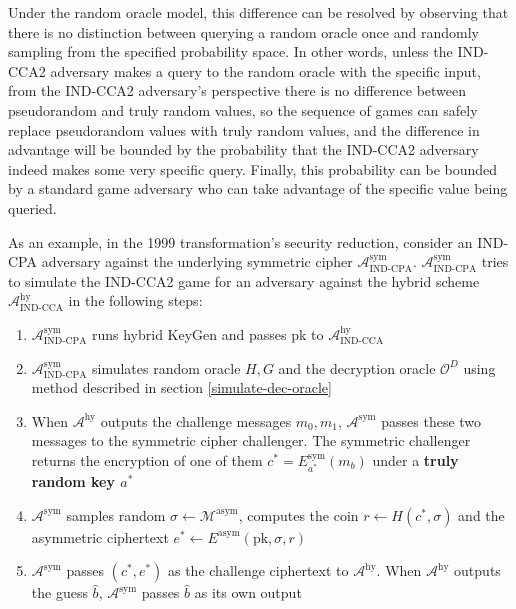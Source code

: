 \documentclass{article}
\begin{document}
Under the random oracle model, this difference can be resolved by observing that there is no distinction between querying a random oracle once and randomly sampling from the specified probability space. In other words, unless the IND-CCA2 adversary makes a query to the random oracle with the specific input, from the IND-CCA2 adversary's perspective there is no difference between pseudorandom and truly random values, so the sequence of games can safely replace pseudorandom values with truly random values, and the difference in advantage will be bounded by the probability that the IND-CCA2 adversary indeed makes some very specific query. Finally, this probability can be bounded by a standard game adversary who can take advantage of the specific value being queried.

As an example, in the 1999 transformation's security reduction, consider an IND-CPA adversary against the underlying symmetric cipher $\mathcal{A}^\text{sym}_\text{IND-CPA}$. $\mathcal{A}^\text{sym}_\text{IND-CPA}$ tries to simulate the IND-CCA2 game for an adversary against the hybrid scheme $\mathcal{A}^\text{hy}_\text{IND-CCA}$ in the following steps:

\begin{enumerate}
    \item $\mathcal{A}^\text{sym}_\text{IND-CPA}$ runs hybrid KeyGen and passes pk to $\mathcal{A}^\text{hy}_\text{IND-CCA}$
    \item $\mathcal{A}^\text{sym}_\text{IND-CPA}$ simulates random oracle $H, G$ and the decryption oracle $\mathcal{O}^D$ using method described in section \ref{simulate-dec-oracle}
    \item When $\mathcal{A}^\text{hy}$ outputs the challenge messages $m_0, m_1$, $\mathcal{A}^\text{sym}$ passes these two messages to the symmetric cipher challenger. The symmetric challenger returns the encryption of one of them $c^\ast = E^\text{sym}_{a^\ast}(m_b)$ under a \textbf{truly random key $a^\ast$}
    \item $\mathcal{A}^\text{sym}$ samples random $\sigma \leftarrow \mathcal{M}^\text{asym}$, computes the coin $r \leftarrow H(c^\ast, \sigma)$ and the asymmetric ciphertext $e^\ast \leftarrow E^\text{asym}(\text{pk}, \sigma, r)$
    \item $\mathcal{A}^\text{sym}$ passes $(c^\ast, e^\ast)$ as the challenge ciphertext to $\mathcal{A}^\text{hy}$. When $\mathcal{A}^\text{hy}$ outputs the guess $\hat{b}$, $\mathcal{A}^\text{sym}$ passes $\hat{b}$ as its own output
\end{enumerate}
\end{document}
